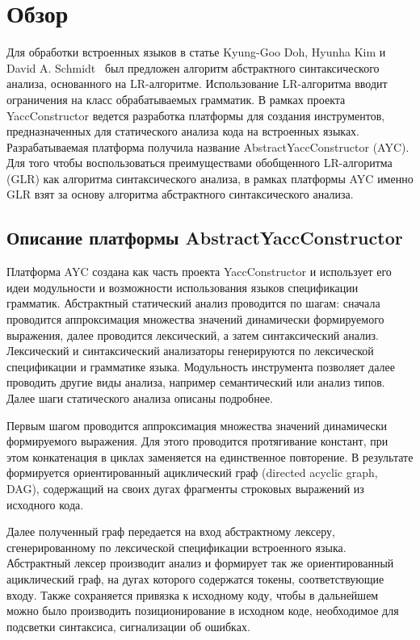 \documentclass{matmex-diploma}
\begin{document}
\section{Обзор}
Для обработки встроенных языков в статье Kyung-Goo Doh, Hyunha Kim и David A. 
Schmidt~\cite{Doh:2011:AL:2074591.2074599} был предложен алгоритм абстрактного 
синтаксического анализа, основанного на LR-алгоритме. Использование LR-алгоритма
вводит ограничения на класс обрабатываемых грамматик. В рамках проекта 
YaccConstructor ведется разработка платформы для создания инструментов, 
предназначенных для статического анализа кода на встроенных языках. Разрабатываемая 
платформа получила название AbstractYaccConstructor (AYC). Для того чтобы 
воспользоваться преимуществами обобщенного LR-алгоритма (GLR) как алгоритма 
синтаксического анализа, в рамках платформы AYC именно GLR взят за основу алгоритма 
абстрактного синтаксического анализа. 

\subsection{Описание платформы AbstractYaccConstructor}
Платформа AYC создана как часть проекта YaccConstructor и использует его идеи 
модульности и возможности использования языков спецификации грамматик. Абстрактный
статический анализ проводится по шагам: сначала проводится аппроксимация множества 
значений динамически формируемого выражения, далее проводится лексический, а затем
синтаксический анализ. Лексический и синтаксический анализаторы генерируются по 
лексической спецификации и грамматике языка. Модульность инструмента позволяет 
далее проводить другие виды анализа, например семантический или анализ типов. 
Далее шаги статического анализа описаны подробнее. 

Первым шагом проводится аппроксимация множества значений динамически формируемого 
выражения. Для этого проводится протягивание констант, при этом конкатенация в циклах 
заменяется на единственное повторение. В результате формируется ориентированный 
ациклический граф (directed acyclic graph, DAG), содержащий на своих дугах 
фрагменты строковых выражений из исходного кода. 

Далее полученный граф передается на вход абстрактному лексеру, сгенерированному 
по лексической спецификации встроенного языка. Абстрактный лексер производит 
анализ и формирует так же ориентированный ациклический граф, на дугах которого
содержатся токены, соответствующие входу. Также сохраняется привязка к исходному 
коду, чтобы в дальнейшем можно было производить позиционирование в исходном коде, 
необходимое для подсветки синтаксиса, сигнализации об ошибках. 
\end{document}
